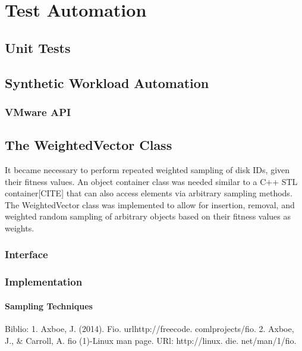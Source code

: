 \chapter{Test Automation}

\section{Unit Tests}

\section{Synthetic Workload Automation}
\subsection{VMware API}


\section{The WeightedVector Class}

It became necessary to perform repeated weighted sampling of disk IDs, given
their fitness values. An object container class was needed similar to a C++ STL
container[CITE] that can also access elements via arbitrary sampling methods.
The WeightedVector class was implemented to allow for insertion, removal, and
weighted random sampling of arbitrary objects based on their fitness values as
weights.

\subsection{Interface}

\subsection{Implementation}

\subsubsection{Sampling Techniques}

Biblio:
1. Axboe, J. (2014). Fio. urlhttp://freecode. comlprojects/fio.
2. Axboe, J., & Carroll, A. fio (1)-Linux man page. URl: http://linux. die. net/man/1/fio.
